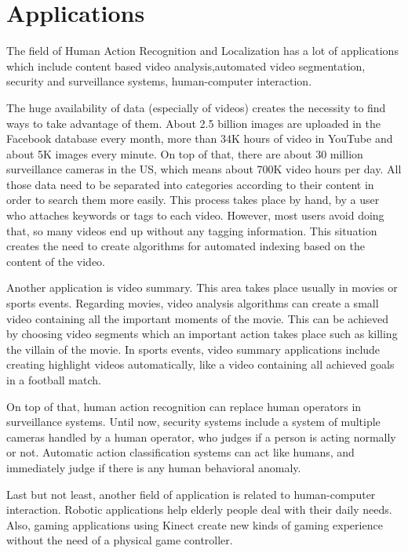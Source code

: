 \section{Applications}
The field of Human Action Recognition and Localization has a lot of applications which include 
 content based video analysis,automated video segmentation, security and surveillance systems,
human-computer interaction.

The huge availability of data (especially of videos) creates the  necessity to find ways to take advantage of them.
About 2.5 billion images are uploaded in the  Facebook database every month, more than 34K hours of video in YouTube and
about 5K images every minute. On top of that, there are about 30 million surveillance cameras in the US, which means
about 700K video hours per day. All those data need to be separated into categories according to their content in
order to search them more easily. This process takes place by hand, by a user who attaches
keywords or tags to each video. However, most users avoid doing that, so many videos end up without any tagging information.
This situation creates the need to create algorithms for automated indexing based on the content of the video.

Another application is video summary. This area takes place usually in movies or sports events. Regarding movies,
video analysis algorithms can create a small video containing all the important moments of the movie. This
can be achieved by choosing video segments which an important action takes place such as killing the villain
of the movie. In sports events, video summary applications include creating highlight videos automatically, like
a video containing all achieved goals in a football match.

On top of that, human action recognition can replace human operators in surveillance systems. Until now,
security systems include a system of multiple cameras handled by a human operator, who judges if a person
is acting normally or not. Automatic action classification systems can act like humans, and immediately
judge if there is any human behavioral anomaly.

Last but not least, another field of application is related to human-computer interaction. Robotic applications
help elderly people deal with their daily needs. Also, gaming applications using Kinect create new kinds of
gaming experience without the need of a physical game controller.

